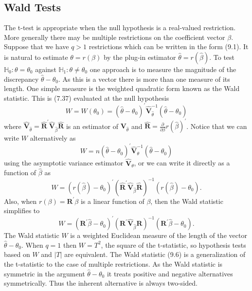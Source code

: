 \documentclass[10pt]{article}
\begin{document}
\subsection{Wald Tests}
The t-test is appropriate when the null hypothesis is a real-valued restriction. More generally there may be multiple restrictions on the coefficient vector $\beta$. Suppose that we have $q>1$ restrictions which can be written in the form (9.1). It is natural to estimate $\theta=r(\beta)$ by the plug-in estimator $\widehat{\theta}=r(\widehat{\beta})$. To test $\mathbb{H}_{0}: \theta=\theta_{0}$ against $\mathbb{H}_{1}: \theta \neq \theta_{0}$ one approach is to measure the magnitude of the discrepancy $\widehat{\theta}-\theta_{0}$. As this is a vector there is more than one measure of its length. One simple measure is the weighted quadratic form known as the Wald statistic. This is (7.37) evaluated at the null hypothesis
$$
W=W\left(\theta_{0}\right)=\left(\widehat{\theta}-\theta_{0}\right)^{\prime} \widehat{\boldsymbol{V}}_{\widehat{\theta}}^{-1}\left(\widehat{\theta}-\theta_{0}\right)
$$
where $\widehat{\boldsymbol{V}}_{\widehat{\theta}}=\widehat{\boldsymbol{R}}^{\prime} \widehat{\boldsymbol{V}}_{\widehat{\beta}} \widehat{\boldsymbol{R}}$ is an estimator of $\boldsymbol{V}_{\widehat{\theta}}$ and $\widehat{\boldsymbol{R}}=\frac{\partial}{\partial \beta} r(\widehat{\beta})^{\prime}$. Notice that we can write $W$ alternatively as
$$
W=n\left(\widehat{\theta}-\theta_{0}\right)^{\prime} \widehat{\boldsymbol{V}}_{\theta}^{-1}\left(\widehat{\theta}-\theta_{0}\right)
$$
using the asymptotic variance estimator $\widehat{\boldsymbol{V}}_{\theta}$, or we can write it directly as a function of $\widehat{\beta}$ as
$$
W=\left(r(\widehat{\beta})-\theta_{0}\right)^{\prime}\left(\widehat{\boldsymbol{R}}^{\prime} \widehat{\boldsymbol{V}}_{\widehat{\beta}} \widehat{\boldsymbol{R}}\right)^{-1}\left(r(\widehat{\beta})-\theta_{0}\right) .
$$
Also, when $r(\beta)=\boldsymbol{R}^{\prime} \beta$ is a linear function of $\beta$, then the Wald statistic simplifies to
$$
W=\left(\boldsymbol{R}^{\prime} \widehat{\beta}-\theta_{0}\right)^{\prime}\left(\boldsymbol{R}^{\prime} \widehat{\boldsymbol{V}}_{\widehat{\beta}} \boldsymbol{R}\right)^{-1}\left(\boldsymbol{R}^{\prime} \widehat{\beta}-\theta_{0}\right) .
$$
The Wald statistic $W$ is a weighted Euclidean measure of the length of the vector $\widehat{\theta}-\theta_{0}$. When $q=1$ then $W=T^{2}$, the square of the t-statistic, so hypothesis tests based on $W$ and $|T|$ are equivalent. The Wald statistic (9.6) is a generalization of the t-statistic to the case of multiple restrictions. As the Wald statistic is symmetric in the argument $\widehat{\theta}-\theta_{0}$ it treats positive and negative alternatives symmetrically. Thus the inherent alternative is always two-sided.
\end{document}

